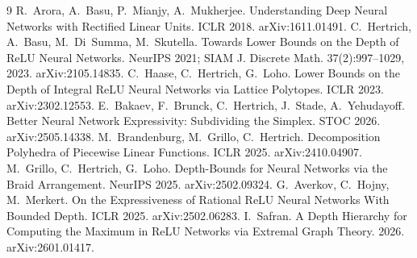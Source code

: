 \documentclass[11pt]{article}
\theoremstyle{definition}
\begin{document}
\begin{thebibliography}{9}
 R.~Arora, A.~Basu, P.~Mianjy, A.~Mukherjee. Understanding Deep Neural Networks with
Rectified Linear Units. ICLR 2018. arXiv:1611.01491.
 C.~Hertrich, A.~Basu, M.~Di~Summa, M.~Skutella. Towards Lower Bounds on the Depth of ReLU
Neural Networks. NeurIPS 2021; SIAM J. Discrete Math. 37(2):997--1029, 2023. arXiv:2105.14835.
 C.~Haase, C.~Hertrich, G.~Loho. Lower Bounds on the Depth of Integral ReLU Neural Networks
via Lattice Polytopes. ICLR 2023. arXiv:2302.12553.
 E.~Bakaev, F.~Brunck, C.~Hertrich, J.~Stade, A.~Yehudayoff. Better Neural Network
Expressivity: Subdividing the Simplex. STOC 2026. arXiv:2505.14338.
 M.~Brandenburg, M.~Grillo, C.~Hertrich. Decomposition Polyhedra of Piecewise Linear
Functions. ICLR 2025. arXiv:2410.04907.
 M.~Grillo, C.~Hertrich, G.~Loho. Depth-Bounds for Neural Networks via the Braid Arrangement.
NeurIPS 2025. arXiv:2502.09324.
 G.~Averkov, C.~Hojny, M.~Merkert. On the Expressiveness of Rational ReLU Neural Networks
With Bounded Depth. ICLR 2025. arXiv:2502.06283.
 I.~Safran. A Depth Hierarchy for Computing the Maximum in ReLU Networks via Extremal Graph
Theory. 2026. arXiv:2601.01417.
\end{thebibliography}
\end{document}
